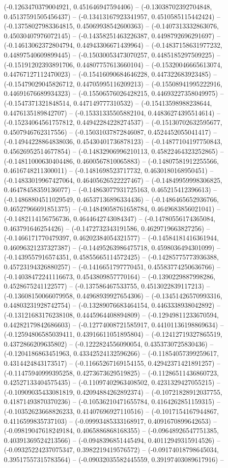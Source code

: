 (-0.1263470379004921, 0.451646947594406) -- (-0.13038702392704848, 0.45137591505456437) -- (-0.13413167923341957, 0.4510585115442424) -- (-0.13758027983364815, 0.45069938542600363) -- (-0.1407313332863076, 0.45030407976072145) -- (-0.14358251463226387, 0.4498792696291697) -- (-0.14613062372804794, 0.44943306671439964) -- (-0.14837158631977232, 0.44897540609899445) -- (-0.15030053473070257, 0.4485185297509225) -- (-0.15191202393891706, 0.44807757613660104) -- (-0.15320046665613074, 0.44767127112470023) -- (-0.15416090684646228, 0.447322683923485) -- (-0.15479029045826712, 0.44705995116209213) -- (-0.15508941995222916, 0.44691676689934323) -- (-0.15506576026428215, 0.44693227358049975) -- (-0.1547371321848514, 0.447149777310532) -- (-0.15413598988238644, 0.4476135189842707) -- (-0.15331335505882104, 0.44836274395514614) -- (-0.15234064561757812, 0.44942284228274537) -- (-0.15130702632595677, 0.4507946762317556) -- (-0.15031037872846087, 0.4524452055041417) -- (-0.14944228864838036, 0.45430401736878123) -- (-0.14877104197750843, 0.45626952514677854) -- (-0.14832906996210113, 0.45822464323252865) -- (-0.14811000630404486, 0.4600567810065883) -- (-0.14807581912255566, 0.4616748211300011) -- (-0.1481698523717732, 0.4630180168950451) -- (-0.14833019967427064, 0.46405626522227467) -- (-0.14849959998306825, 0.46478458359136077) -- (-0.14863077931725163, 0.465215412396613) -- (-0.14868804511029549, 0.46537136896334436) -- (-0.1486465652936766, 0.46527966691851375) -- (-0.14849058761658784, 0.4649683856021041) -- (-0.1482114156756736, 0.4644642743084347) -- (-0.14780556174365084, 0.463791646254426) -- (-0.1472732343191586, 0.4629719663827256) -- (-0.1466171770479397, 0.46202384054321577) -- (-0.14584181416361944, 0.46096321237327387) -- (-0.14495263986475718, 0.4598036494301099) -- (-0.1439557916574351, 0.45855665114572425) -- (-0.14285775773936388, 0.45723194326880257) -- (-0.1416651797770451, 0.45583774250636766) -- (-0.14038472241116673, 0.4543809857770164) -- (-0.1390229887998286, 0.4528675241122577) -- (-0.137586467533755, 0.4513022839117213) -- (-0.13608150066079958, 0.44968939927654306) -- (-0.13451426570993316, 0.44803231928742754) -- (-0.13289076683464154, 0.4463338938042892) -- (-0.13121683176238108, 0.4445964408894809) -- (-0.12949811233670594, 0.44282179842686603) -- (-0.12774008721585917, 0.44101136198869634) -- (-0.12594806585039411, 0.43916611051895804) -- (-0.12412719327865519, 0.4372866209635802) -- (-0.1222824556090054, 0.4353730725830436) -- (-0.1204186863451963, 0.43342524132596266) -- (-0.11854057399259617, 0.4314424843173517) -- (-0.11665267169154155, 0.42942371421891257) -- (-0.11475940999395258, 0.4273673629519825) -- (-0.11286511436860723, 0.42527133404575435) -- (-0.11097402963408502, 0.4231329427055215) -- (-0.10909035433081819, 0.42094884262892374) -- (-0.10721828912037755, 0.41871493870370236) -- (-0.10536210471655784, 0.4164262851159315) -- (-0.10352623668826233, 0.41407696927110516) -- (-0.1017154167944867, 0.4116599835737103) -- (-0.09993485333168917, 0.4091670899642653) -- (-0.09819047618249184, 0.4065886868168355) -- (-0.09648926547751385, 0.40391369524213566) -- (-0.0948396851445494, 0.40112949315914526) -- (-0.09325224237075347, 0.3982219419576572) -- (-0.09174018798645034, 0.39517557315783564) -- (-0.09032035582445559, 0.39197403089617916) -- 